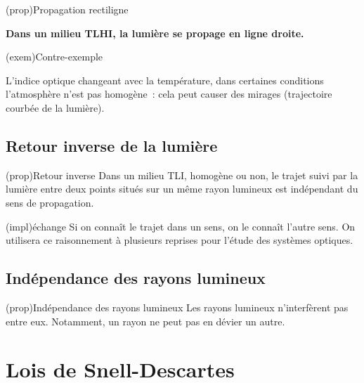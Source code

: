\documentclass[../../main/main.tex]{subfiles}
\begin{document}
\begin{tcbraster}[raster columns=2, raster equal height=rows]
	\begin{tcb}[label=prop:prop_rect, valign=center](prop){Propagation rectiligne}

		\bfseries Dans un milieu TLHI, la lumière se propage en ligne droite.

	\end{tcb}
	\begin{tcb}(exem){Contre-exemple}

		L'indice optique changeant avec la température, dans certaines
		conditions l'atmosphère n'est pas homogène~: cela peut causer des
		mirages (trajectoire courbée de la lumière).

	\end{tcb}
\end{tcbraster}

\subsection{Retour inverse de la lumière}

\begin{tcbraster}[raster columns=2, raster equal height=rows]
	\begin{tcb}[label=prop:ret_inv](prop){Retour inverse}
		Dans un milieu TLI, homogène ou non, le trajet suivi par la lumière
		entre deux points situés sur un même rayon lumineux est indépendant du
		sens de propagation.
	\end{tcb}
	\begin{tcb}[label=impl:ret_inv](impl){échange}
		Si on connaît le trajet dans un sens, on le connaît l'autre sens. On
		utilisera ce raisonnement à plusieurs reprises pour l'étude des systèmes
		optiques.
	\end{tcb}
\end{tcbraster}

\subsection{Indépendance des rayons lumineux}

\begin{tcb}[label=prop:ind_lum](prop){Indépendance des rayons lumineux}
	Les rayons lumineux n'interfèrent pas entre eux. Notamment, un rayon ne peut
	pas en dévier un autre.
\end{tcb}

\section{Lois de Snell-Descartes}
\end{document}
